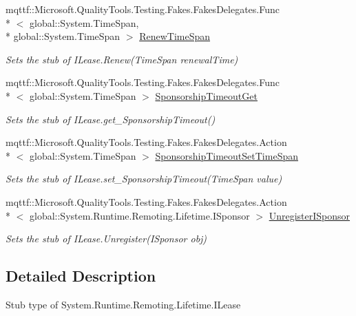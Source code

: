 \begin{DoxyCompactItemize}
mqttf\-::\-Microsoft.\-Quality\-Tools.\-Testing.\-Fakes.\-Fakes\-Delegates.\-Func\\*
$<$ global\-::\-System.\-Time\-Span, \\*
global\-::\-System.\-Time\-Span $>$ \hyperlink{class_system_1_1_runtime_1_1_remoting_1_1_lifetime_1_1_fakes_1_1_stub_i_lease_aef76fa56ca245bacb750c5b95136bfd8}{Renew\-Time\-Span}
\begin{DoxyCompactList}\small\item\em Sets the stub of I\-Lease.\-Renew(\-Time\-Span renewal\-Time)\end{DoxyCompactList}\item 
mqttf\-::\-Microsoft.\-Quality\-Tools.\-Testing.\-Fakes.\-Fakes\-Delegates.\-Func\\*
$<$ global\-::\-System.\-Time\-Span $>$ \hyperlink{class_system_1_1_runtime_1_1_remoting_1_1_lifetime_1_1_fakes_1_1_stub_i_lease_a7a71f28a3aa93f67c5efa074a60c2c28}{Sponsorship\-Timeout\-Get}
\begin{DoxyCompactList}\small\item\em Sets the stub of I\-Lease.\-get\-\_\-\-Sponsorship\-Timeout()\end{DoxyCompactList}\item 
mqttf\-::\-Microsoft.\-Quality\-Tools.\-Testing.\-Fakes.\-Fakes\-Delegates.\-Action\\*
$<$ global\-::\-System.\-Time\-Span $>$ \hyperlink{class_system_1_1_runtime_1_1_remoting_1_1_lifetime_1_1_fakes_1_1_stub_i_lease_ae6bad36356d4c2d177d7b915045d4b12}{Sponsorship\-Timeout\-Set\-Time\-Span}
\begin{DoxyCompactList}\small\item\em Sets the stub of I\-Lease.\-set\-\_\-\-Sponsorship\-Timeout(\-Time\-Span value)\end{DoxyCompactList}\item 
mqttf\-::\-Microsoft.\-Quality\-Tools.\-Testing.\-Fakes.\-Fakes\-Delegates.\-Action\\*
$<$ global\-::\-System.\-Runtime.\-Remoting.\-Lifetime.\-I\-Sponsor $>$ \hyperlink{class_system_1_1_runtime_1_1_remoting_1_1_lifetime_1_1_fakes_1_1_stub_i_lease_a01949d3e221bb1cca7fb09e09174081c}{Unregister\-I\-Sponsor}
\begin{DoxyCompactList}\small\item\em Sets the stub of I\-Lease.\-Unregister(\-I\-Sponsor obj)\end{DoxyCompactList}\end{DoxyCompactItemize}


\subsection{Detailed Description}
Stub type of System.\-Runtime.\-Remoting.\-Lifetime.\-I\-Lease



